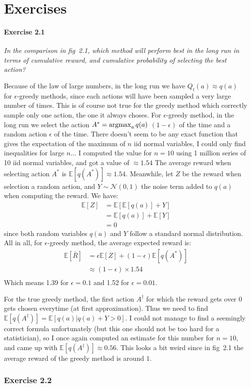 \section{Exercises}

\paragraph{Exercise 2.1}
\textit{In the comparison in fig~2.1, which method will perform best in the long run in terms of cumulative reward, and cumulative probability of selecting the best action?}

Because of the law of large numbers, in the long run we have $Q_t(a) \approx q(a)$ for $\epsilon$-greedy methods, since each actions will have been sampled a very large number of times.
This is of course not true for the greedy method which correctly sample only one action, the one it always choses.
For $\epsilon$-greedy method, in the long run we select the action $A^* = \operatorname*{argmax}_a q(a)$ $(1 - \epsilon)$ of the time and a random action $\epsilon$ of the time.
There doesn't seem to be any exact function that gives the expectation of the maximum of $n$ iid normal variables, I could only find inequalities for large $n$...
I computed the value for $n = 10$ using 1 million series of 10 iid normal variables, and got a value of $\approx 1.54$
The average reward when selecting action $A^*$ is $\mathbb{E}[q(A^*)] \approx 1.54$.
Meanwhile, let $Z$ be the reward when selection a random action, and $Y \sim \mathcal{N}(0,1)$ the noise term added to $q(a)$ when computing the reward.
We have:
\begin{align*}
\mathbb{E}[Z] &= \mathbb{E}[\mathbb{E}[q(a)] + Y] \\
              &= \mathbb{E}[q(a)] + \mathbb{E}[Y] \\
              &= 0
\end{align*}
since both random variables $q(a)$ and $Y$ follow a standard normal distribution.
All in all, for $\epsilon$-greedy method, the average expected reward is:
\begin{align*}
\mathbb{E}[\bar{R}] &= \epsilon \mathbb{E}[Z] + (1 - \epsilon) \mathbb{E}[q(A^*)] \\
                    &\approx (1 - \epsilon) \times 1.54 \\
\end{align*}
Which means 1.39 for $\epsilon = 0.1$ and 1.52 for $\epsilon = 0.01$.

For the true greedy method, the first action $A^\dagger$ for which the reward gets over 0 gets chosen everytime (at first approximation).
Thus we need to find $\mathbb{E}[q(A^\dagger)] = \mathbb{E}[q(a)| q(a) + Y > 0]$.
I could not manage to find a seemingly correct formula unfortunately (but this one should not be too hard for a statistician), so I once again computed an estimate for this number for $n = 10$, and came up with $\mathbb{E}[q(A^\dagger)] \approx 0.56$.
This looks a bit weird since in fig~2.1 the average reward of the greedy method is around $1$.

\subsubsection{Exercise 2.2}


